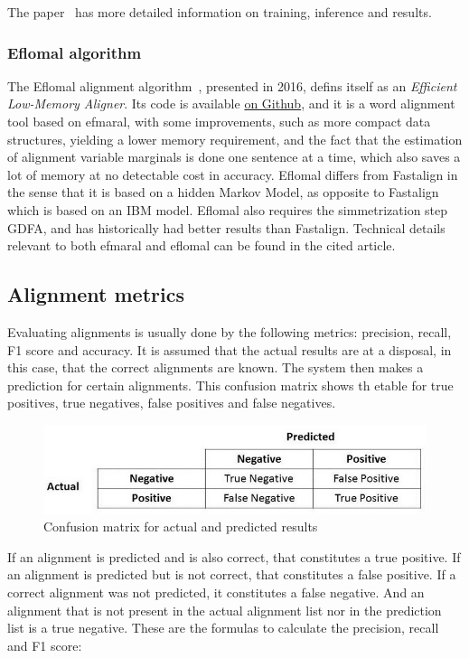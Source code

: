 The paper~\cite{dyer-etal-2013-simple} has more detailed information on training, inference and results.

\subsubsection{Eflomal algorithm}

The Eflomal alignment algorithm~\cite{ostling2016efficient}, presented in 2016, defins itself as an \emph{Efficient Low-Memory Aligner}. Its code is available \href{https://github.com/robertostling/eflomal}{on Github}, and it is a word alignment tool based on efmaral, with some improvements, such as more compact data structures, yielding a lower memory requirement, and the fact that the estimation of alignment variable marginals is done one sentence at a time, which also saves a lot of memory at no detectable cost in accuracy. Eflomal differs from Fastalign in the sense that it is based on a hidden Markov Model, as opposite to Fastalign which is based on an IBM model. Eflomal also requires the simmetrization step GDFA, and has historically had better results than Fastalign. Technical details relevant to both efmaral and eflomal can be found in the cited article.

\subsection{Alignment metrics}\label{tra:metrics}

Evaluating alignments is usually done by the following metrics: precision, recall, F1 score and accuracy. It is assumed that the actual results are at a disposal, in this case, that the correct alignments are known. The system then makes a prediction for certain alignments. This confusion matrix shows th etable for true positives, true negatives, false positives and false negatives.

\begin{figure}[!ht]
    \centering
    \includegraphics[width=12cm]{figures/precrec.jpeg}
    \caption{Confusion matrix for actual and predicted results}
\end{figure}

If an alignment is predicted and is also correct, that constitutes a true positive. If an alignment is predicted but is not correct, that constitutes a false positive. If a correct alignment was not predicted, it constitutes a false negative. And an alignment that is not present in the actual alignment list nor in the prediction list is a true negative. These are the formulas to calculate the precision, recall and F1 score:

